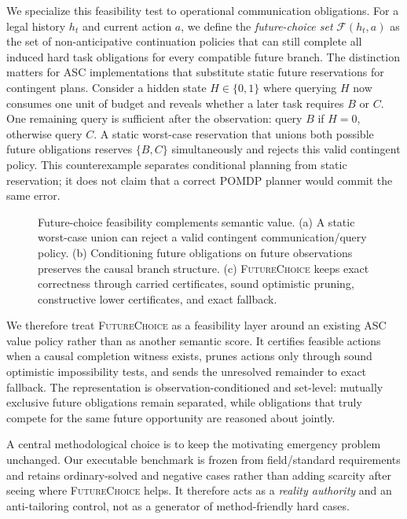 \documentclass[conference]{IEEEtran}
\newcommand{\futurechoice}{\textsc{FutureChoice}\xspace}
\newcommand{\Choices}{\mathcal{F}}
\begin{document}
We specialize this feasibility test to operational communication obligations. For a legal history $h_t$ and current action $a$, we define the \emph{future-choice set} $\Choices(h_t,a)$ as the set of non-anticipative continuation policies that can still complete all induced hard task obligations for every compatible future branch. The distinction matters for ASC implementations that substitute static future reservations for contingent plans. Consider a hidden state $H\in\{0,1\}$ where querying $H$ now consumes one unit of budget and reveals whether a later task requires $B$ or $C$. One remaining query is sufficient after the observation: query $B$ if $H=0$, otherwise query $C$. A static worst-case reservation that unions both possible future obligations reserves $\{B,C\}$ simultaneously and rejects this valid contingent policy. This counterexample separates conditional planning from static reservation; it does not claim that a correct POMDP planner would commit the same error.

\begin{figure}[t]
\centering
\resizebox{0.98\textwidth}{!}{}
\caption{Future-choice feasibility complements semantic value. (a) A static worst-case union can reject a valid contingent communication/query policy. (b) Conditioning future obligations on future observations preserves the causal branch structure. (c) \futurechoice keeps exact correctness through carried certificates, sound optimistic pruning, constructive lower certificates, and exact fallback.}
\label{fig:mechanism}
\end{figure}

We therefore treat \futurechoice as a feasibility layer around an existing ASC value policy rather than as another semantic score. It certifies feasible actions when a causal completion witness exists, prunes actions only through sound optimistic impossibility tests, and sends the unresolved remainder to exact fallback. The representation is observation-conditioned and set-level: mutually exclusive future obligations remain separated, while obligations that truly compete for the same future opportunity are reasoned about jointly.

A central methodological choice is to keep the motivating emergency problem unchanged. Our executable benchmark is frozen from field/standard requirements and retains ordinary-solved and negative cases rather than adding scarcity after seeing where \futurechoice helps. It therefore acts as a \emph{reality authority} and an anti-tailoring control, not as a generator of method-friendly hard cases.
\end{document}
